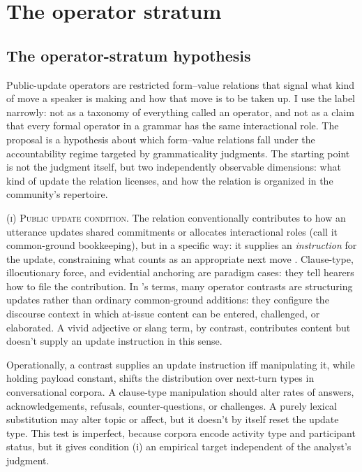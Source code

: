 \documentclass[12pt,letterpaper]{article}
\begin{document}
\section{The operator stratum}

\subsection{The operator-stratum hypothesis}

Public-update operators are restricted form--value relations that signal what kind of move a speaker is making and how that move is to be taken up. I use the label narrowly: not as a taxonomy of everything called an operator, and not as a claim that every formal operator in a grammar has the same interactional role. The proposal is a hypothesis about which form--value relations fall under the accountability regime targeted by grammaticality judgments. The starting point is not the judgment itself, but two independently observable dimensions: what kind of update the relation licenses, and how the relation is organized in the community's repertoire.

\textsc{(i) Public update condition.} The relation conventionally contributes to how an utterance updates shared commitments or allocates interactional roles (call it common-ground bookkeeping), but in a specific way: it supplies an \emph{instruction} for the update, constraining what counts as an appropriate next move \citep{stalnaker2002,farkasbruce2010,murray2014update}. Clause-type, illocutionary force, and evidential anchoring are paradigm cases: they tell hearers how to file the contribution. In \textcite{murray2014update}'s terms, many operator contrasts are structuring updates rather than ordinary common-ground additions: they configure the discourse context in which at-issue content can be entered, challenged, or elaborated. A vivid adjective or slang term, by contrast, contributes content but doesn't supply an update instruction in this sense.

Operationally, a contrast supplies an update instruction iff manipulating it, while holding payload constant, shifts the distribution over next-turn types in conversational corpora. A clause-type manipulation should alter rates of answers, acknowledgements, refusals, counter-questions, or challenges. A purely lexical substitution may alter topic or affect, but it doesn't by itself reset the update type. This test is imperfect, because corpora encode activity type and participant status, but it gives condition (i) an empirical target independent of the analyst's judgment.
\end{document}
